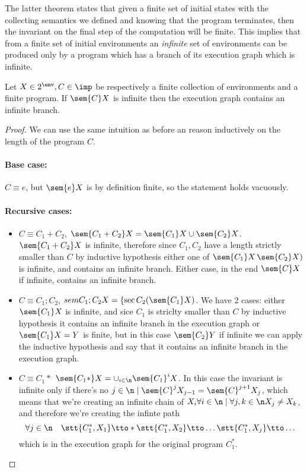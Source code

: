 \begin{observation}\label{obs:finite}
  The latter theorem states that given a finite set of initial states
  with the collecting semantics we defined and knowing that the
  program terminates, then the invariant on the final step of the
  computation will be finite. This implies that from a finite set of
  initial environments an \emph{infinite} set of environments can be
  produced only by a program which has a branch of its execution graph
  which is infinite.
\end{observation}

\begin{lemma}
  Let \(X\in2^\env, C\in\imp\) be respectively a finite collection of
  environments and a finite program. If \(\sem{C}X\) is infinite then
  the execution graph contains an infinite branch.
\end{lemma}

\begin{proof}
  We can use the same intuition as before an reason inductively on the
  length of the program \(C\).
  \paragraph*{Base case:\\}
  \(C\equiv e\), but \(\sem{e}X\) is by definition finite, so the
  statement holds vacuously.
  \paragraph*{Recursive cases:\\}
  \begin{itemize}
  \item \(C\equiv C_1 + C_2\), \(\sem{C_1 + C_2} X = \sem{C_1}X \cup
    \sem{C_2}X\). \(\sem{C_1 + C_2} X\) is infinite, therefore since
    \(C_1, C_2\) have a length strictly smaller than \(C\) by
    inductive hypothesis either one of \(\sem{C_1}X\, \sem{C_2}X)\) is
    infinite, and contains an infinite branch. Either case, in the end
    \(\sem{C}X\) if infinite, contains an infinite branch.
  \item \(C\equiv C_1;C_2\), \(sem{C_1;C_2}X =
    \{\sec{C_2}(\sem{C_1}X)\). We have 2 cases: either \(\sem{C_1}X\)
    is infinite, and sice \(C_1\) is striclty smaller than \(C\) by
    inductive hypothesis it contains an infinite branch in the
    execution graph or \(\sem{C_1}X = Y\) is finite, but in this case
    \(\sem{C_2}Y\) if infinite we can apply the inductive hypothesis
    and say that it contains an infinite branch in the execution
    graph.
  \item \(C \equiv C_1*\) \(\sem{C_1*}X =
    \cup_{i\in\n}\sem{C_1}^iX\). In this case the invariant is
    infinite only if there's no \(j\in\n\mid \sem{C}^jX_{j-1} =
    \sem{C}^{j+1}X_{j}\), which means that we're creating an infinite
    chain of \(X_i \forall i \in \n \mid \forall j,k \in \n X_j \neq
    X_k\), and therefore we're creating the infinte path \[\forall j
    \in \n \quad \stt{C_1^*, X_1} \tto* \stt{C_1^*, X_2} \tto \dots
    \stt{C_1^*, X_j} \tto \dots\] which is in the execution graph for
    the original program \(C_1^*\).
  \end{itemize}
\end{proof}

